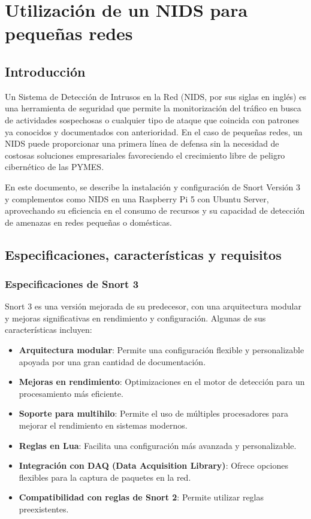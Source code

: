 \documentclass[11pt,a4paper,twoside]{report}
\begin{document}
\chapter{Utilización de un NIDS para pequeñas redes}
\section{Introducción}
Un Sistema de Detección de Intrusos en la Red (NIDS, por sus siglas en inglés) es una herramienta de seguridad que permite la monitorización del tráfico en busca de actividades sospechosas o cualquier tipo de ataque que coincida con patrones ya conocidos y documentados con anterioridad. En el caso de pequeñas redes, un NIDS puede proporcionar una primera línea de defensa sin la necesidad de costosas soluciones empresariales favoreciendo el crecimiento libre de peligro cibernético de las PYMES.
\newline

En este documento, se describe la instalación y configuración de Snort Versión 3 y complementos como NIDS en una Raspberry Pi 5 con Ubuntu Server, aprovechando su eficiencia en el consumo de recursos y su capacidad de detección de amenazas en redes pequeñas o domésticas.

\section{Especificaciones, características y requisitos}

\subsection{Especificaciones de Snort 3}

Snort 3 es una versión mejorada de su predecesor, con una arquitectura modular y mejoras significativas en rendimiento y configuración. Algunas de sus características incluyen:

\begin{itemize}
\item \textbf{Arquitectura modular}: Permite una configuración flexible y personalizable apoyada por una gran cantidad de documentación.
\item \textbf{Mejoras en rendimiento}: Optimizaciones en el motor de detección para un procesamiento más eficiente.
\item \textbf{Soporte para multihilo}: Permite el uso de múltiples procesadores para mejorar el rendimiento en sistemas modernos.
\item \textbf{Reglas en Lua}: Facilita una configuración más avanzada y personalizable.
\item \textbf{Integración con DAQ (Data Acquisition Library)}: Ofrece opciones flexibles para la captura de paquetes en la red.
\item \textbf{Compatibilidad con reglas de Snort 2}: Permite utilizar reglas preexistentes.
\end{itemize}
\end{document}
